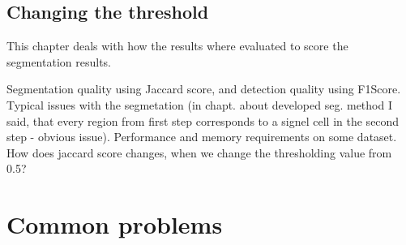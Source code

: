\documentclass[
  digital,     %
  oneside,     %
  nosansbold,  %
  nocolorbold, %
  lof,         %
  lot,         %
]{fithesis4}
\begin{document}
\subsection{Changing the threshold}


This chapter deals with how the results where evaluated to score the
segmentation results.

Segmentation quality using Jaccard score, and detection quality using F1Score.
Typical issues with the segmetation (in chapt. about developed seg. method I
said, that every region from first step corresponds to a signel cell in the
second step - obvious issue). Performance and memory requirements on some
dataset. How does jaccard score changes, when we change the thresholding value
from 0.5?

\section{Common problems}
\end{document}
